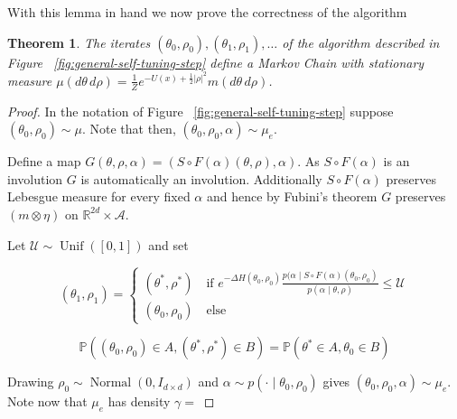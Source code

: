 \documentclass[ejs]{imsart}
\theoremstyle{plain}%
\newtheorem{theorem}[prototheorem]{Theorem}
\theoremstyle{remark}
\begin{document}
{With this lemma in hand we now prove the correctness of the algorithm

\begin{theorem}
The iterates $(\theta_0, \rho_0), (\theta_1, \rho_1), \dots $ of the algorithm described in Figure ~\ref{fig:general-self-tuning-step} define a Markov Chain with stationary measure $\mu(d \theta \, d \rho) = \frac{1}{Z} e^{-U(x) + \frac{1}{2} |\rho|^2} m(d \theta \, d \rho)$.
\end{theorem}

\begin{proof}
In the notation of Figure ~\ref{fig:general-self-tuning-step} suppose  $(\theta_0, \rho_0) \sim \mu$. Note that then, $(\theta_0, \rho_0, \alpha) \sim \mu_e$. 

Define a map $G(\theta, \rho, \alpha) = (S \circ F(\alpha)(\theta, \rho), \alpha)$. As $S \circ F(\alpha)$ is an involution $G$ is automatically an involution. Additionally $S \circ F(\alpha)$ preserves Lebesgue measure for every fixed $\alpha$ and hence by Fubini's theorem $G$ preserves $(m \otimes \eta)$ on $\mathbb{R}^{2d} \times \mathcal{A}$.

Let $\mathcal{U} \sim \operatorname{Unif}([0,1])$ and set 

\[
(\theta_1, \rho_1) =\begin{cases}
(\theta^*, \rho^*) \quad \text{if  } e^{-\Delta H(\theta_0, \rho_0)} \frac{p(\alpha \mid S \circ F(\alpha)(\theta_0, \rho_0)}{p(\alpha \mid \theta, \rho)} \leq \mathcal{U} \\
(\theta_0, \rho_0) \quad \text{else}
\end{cases}
\]

\[ \mathbb{P}((\theta_0, \rho_0) \in A, (\theta^*, \rho^*) \in B)  = \mathbb{P}(\theta^* \in A, \theta_0 \in B)\]

Drawing $\rho_0 \sim \operatorname{Normal}(0,I_{d \times d})$ and $\alpha \sim p(\cdot \mid \theta_0, \rho_0)$ gives $(\theta_0, \rho_0, \alpha) \sim \mu_e$. Note now that $\mu_e$ has density $\gamma =  $    
\end{proof}


\label{app:proof_of_correctness}
}
\end{document}
